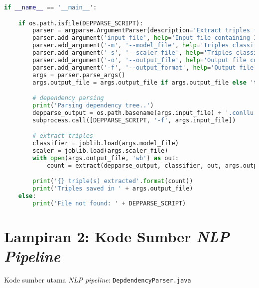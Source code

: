 \begin{lstlisting}[language=Python]
if __name__ == '__main__':

    if os.path.isfile(DEPPARSE_SCRIPT):
        parser = argparse.ArgumentParser(description='Extract triples from Indonesian text')
        parser.add_argument('input_file', help='Input file containing 1 (one) Indonesian sentence per line')
        parser.add_argument('-m', '--model_file', help='Triples classifier model file', default='triples-classifier-model.pkl')
        parser.add_argument('-s', '--scaler_file', help='Triples classifier scaler file', default='triples-classifier-scaler.pkl')
        parser.add_argument('-o', '--output_file', help='Output file containing triples')
        parser.add_argument('-f', '--output_format', help='Output file format', choices=['json', 'tsv'], default='json')
        args = parser.parse_args()
        args.output_file = args.output_file if args.output_file else 'triples.' + args.output_format

        # dependency parsing
        print('Parsing dependency tree..')
        depparse_output = os.path.basename(args.input_file) + '.conllu'
        subprocess.call([DEPPARSE_SCRIPT, '-f', args.input_file])

        # extract triples
        classifier = joblib.load(args.model_file)
        scaler = joblib.load(args.scaler_file)
        with open(args.output_file, 'wb') as out:
            count = extract(depparse_output, classifier, out, args.output_format, scaler=scaler)

        print('{} triple(s) extracted'.format(count))
        print('Triples saved in ' + args.output_file)
    else:
        print('File not found: ' + DEPPARSE_SCRIPT)
\end{lstlisting}


\chapter*{Lampiran 2: Kode Sumber \textit{NLP Pipeline}}

Kode sumber utama \textit{NLP pipeline}: \verb|DepdendencyParser.java|

